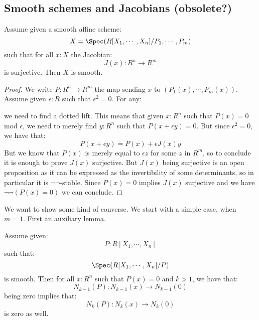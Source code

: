 \subsection{Smooth schemes and Jacobians (obsolete?)}

\begin{lemma}
Assume given a smooth affine scheme:
\[X = \Spec(R[X_1,\cdots,X_n]/P_1,\cdots,P_m)\]
such that for all $x:X$ the Jacobian:
\[J(x) : R^n \to R^m\]
is surjective. Then $X$ is smooth.
\end{lemma}

\begin{proof}
We write $P: R^n\to R^m$ the map sending $x$ to $(P_1(x),\cdots,P_m(x))$. Assume given $\epsilon:R$ such that $\epsilon^2 = 0$. For any:
 \begin{center}
    \end{center} 
    we need to find a dotted lift. This means that given $x:R^n$ such that $P(x)=0$ mod $\epsilon$, we need to merely find $y:R^n$ such that $P(x+\epsilon y) = 0$. But since $\epsilon^2=0$, we have that:
    \[P(x+\epsilon y) = P(x) + \epsilon J(x)y\]
    But we know that $P(x)$ is merely equal to $\epsilon z$ for some $z$ in $R^m$, so to conclude it is enough to prove $J(x)$ surjective. But $J(x)$ being surjective is an open proposition as it can be expressed as the invertibility of some determinants, so in particular it is $\neg\neg$-stable. Since $P(x)=0$ implies $J(x)$ surjective and we have $\neg\neg(P(x)=0)$ we can conclude.
\end{proof}

We want to show some kind of converse. We start with a simple case, when $m=1$. First an auxiliary lemma.

\begin{lemma}\label{order-smooth-add-one}
Assume given:
\[P : R[X_1,\cdots,X_n]\]
such that:
\[\Spec(R[X_1,\cdots,X_n]/P)\] 
is smooth. Then for all $x:R^n$ such that $P(x)=0$ and $k>1$, we have that:
\[N_{k-1}(P) : N_{k-1}(x) \to N_{k-1}(0)\]
being zero implies that:
\[N_{k}(P) : N_{k}(x) \to N_{k}(0)\]
is zero as well.
\end{lemma}

